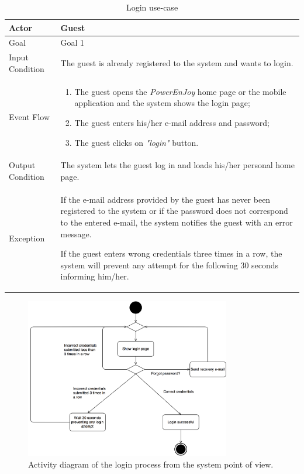 \begin{table}[H]
\begin{center}
\begin{tabular}{p{} | p{}}
\hline
Actor & Guest\\
\hline
Goal & Goal 1\\
\hline
Input Condition & The guest is already registered to the system and wants to login.\\
\hline
Event Flow & 
\begin{enumerate}
\item The guest opens the \emph{PowerEnJoy} home page or the mobile application and the system shows the login page;
\item The guest enters his/her e-mail address and password;
\item The guest clicks on \emph{"login"} button.
\end{enumerate} \\
\hline
Output Condition & The system lets the guest log in and loads his/her personal home page.\\
\hline
Exception & 
If the e-mail address provided by the guest has never been registered to the system or if the password does not correspond to the entered e-mail, the system notifies the guest with an error message.

If the guest enters wrong credentials three times in a row, the system will prevent any attempt for the following 30 seconds informing him/her.\\
\hline
\end{tabular}
\end{center}
\caption{Login use-case}
\label{login_uc}
\end{table}

\begin{figure}[H]
\begin{center}
		\includegraphics[width=0.8\textwidth]{./specific_requirements/features/diagrams/login_activity.png}
		\caption{Activity diagram of the login process from the system point of view.}
		\label{login_act}
\end{center}
\end{figure}

